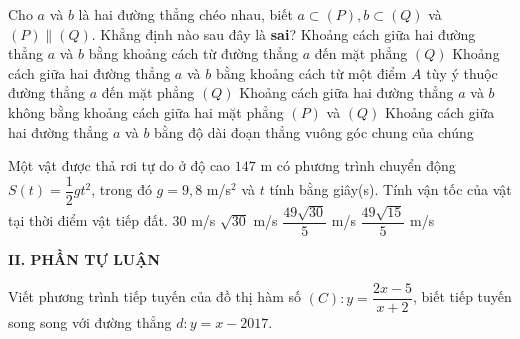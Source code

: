 \begin{ex}%
	Cho $ a $ và $ b $ là hai đường thẳng chéo nhau, biết $ a\subset (P), b\subset (Q) $ và $ (P)\parallel (Q) $. Khẳng định nào sau đây là \textbf{sai}?
	\choice
	{Khoảng cách giữa hai đường thẳng $ a $ và $ b $ bằng khoảng cách từ đường thẳng $ a $ đến mặt phẳng $ (Q) $}
	{Khoảng cách giữa hai đường thẳng $ a $ và $ b $ bằng khoảng cách từ một điểm $ A $ tùy ý thuộc đường thẳng $ a $ đến mặt phẳng $ (Q) $}
	{\True Khoảng cách giữa hai đường thẳng $ a $ và $ b $ không bằng khoảng cách giữa hai mặt phẳng $ (P) $ và $ (Q) $}
	{Khoảng cách giữa hai đường thẳng $ a $ và $ b $ bằng độ dài đoạn thẳng vuông góc chung của chúng}
\end{ex}


\begin{ex}%
	Một vật được thả rơi tự do ở độ cao $ 147 $ m có phương trình chuyển động $ S(t)=\dfrac{1}{2}gt^2 $, trong đó $ g=9,8 $ m/s$ ^2 $ và $ t $ tính bằng giây(s). Tính vận tốc của vật tại thời điểm vật tiếp đất. 
	\choice
	{$30$ m/s}
	{$\sqrt{30}$ m/s}
	{\True $\dfrac{49\sqrt{30}}{5}$ m/s}
	{$\dfrac{49\sqrt{15}}{5}$ m/s}
\end{ex}










\noindent\textbf{II. PHẦN TỰ LUẬN}
\begin{bt}%
	Viết phương trình tiếp tuyến của đồ thị hàm số $ (C): y=\dfrac{2x-5}{x+2} $, biết tiếp tuyến song song với đường thẳng $ d: y=x-2017 $.
\end{bt}

